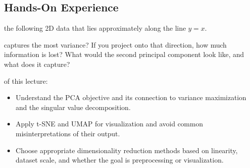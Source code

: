\subsection{Hands-On Experience}

 the following 2D data that lies approximately along the line $y{=}x$.

\begin{marginfigure}
\centering
{}
\caption{Data lies along a 1D subspace. The direction of maximum variance is the first principal component.}
\label{fig:pca_intro}
\end{marginfigure}

 captures the most variance?
If you project onto that direction, how much information is lost?
What would the second principal component look like, and what does it capture?

\vspace{2.5em}

 of this lecture:
\begin{itemize}
    \item Understand the PCA objective and its connection to variance maximization and the singular value decomposition.
    \item Apply t-SNE and UMAP for visualization and avoid common misinterpretations of their output.
    \item Choose appropriate dimensionality reduction methods based on linearity, dataset scale, and whether the goal is preprocessing or visualization.
\end{itemize}


